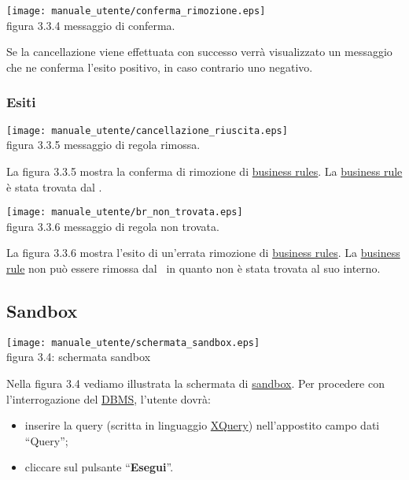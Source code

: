 \begin{center}
\texttt{[image: manuale\_utente/conferma\_rimozione.eps]}\\
 figura 3.3.4 messaggio di conferma.
\end{center} 

Se la cancellazione viene effettuata con successo verr\`a visualizzato un messaggio che ne conferma l'esito positivo, in caso contrario uno negativo.
\subsubsection{Esiti}
 
\begin{center}
\texttt{[image: manuale\_utente/cancellazione\_riuscita.eps]}\\
figura 3.3.5 messaggio di regola rimossa.
\end{center} 
La figura 3.3.5 mostra la conferma di rimozione di \underline{business rules}. La \underline{business rule} \`e stata trovata dal \rp.

\begin{center}
\texttt{[image: manuale\_utente/br\_non\_trovata.eps]}\\
 figura 3.3.6 messaggio di regola non trovata.
\end{center} 
La figura 3.3.6 mostra l'esito di un'errata rimozione di \underline{business rules}. La \underline{business rule} non pu\`o essere rimossa dal \rp\ in quanto non \`e stata trovata al suo interno.

\subsection{Sandbox}
\begin{center}
 \texttt{[image: manuale\_utente/schermata\_sandbox.eps]} \\
 figura 3.4: schermata sandbox
\end{center}
Nella figura 3.4 vediamo illustrata la schermata di \underline{sandbox}. Per procedere con l'interrogazione del \underline{DBMS}, l'utente dovr\`a:
\begin{itemize}
\item inserire la query (scritta in linguaggio \underline{XQuery}) nell'appostito campo dati ``Query'';
\item cliccare sul pulsante ``\textbf{Esegui}''.
\end{itemize}

